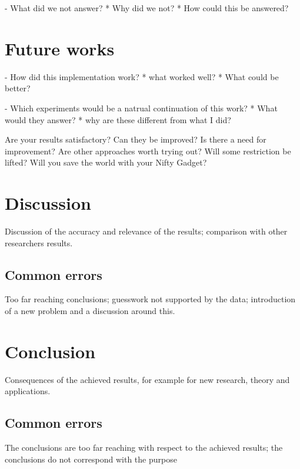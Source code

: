 - What did we not answer? 
* Why did we not?
* How could this be answered?

\section{Future works}
- How did this implementation work?
* what worked well?
* What could be better?

- Which experiments would be a natrual continuation of this work?
* What would they answer?
* why are these different from what I did?




Are your results satisfactory? 
Can they be improved? 
Is there a need for improvement? 
Are other approaches worth trying out? 
Will some restriction be lifted? 
Will you save the world with your Nifty Gadget? 

\section{Discussion} 
Discussion of the accuracy and relevance of the results; comparison with other researchers results. 
\subsection{Common errors}
Too far reaching conclusions; guesswork not supported by the data; introduction of a new problem and a discussion around this.  

\section{Conclusion} 
Consequences of the achieved results, for example for new research, theory and applications. 

\subsection{Common errors}
The conclusions are too far reaching with respect to the achieved results; the conclusions do not correspond with the purpose
\fi